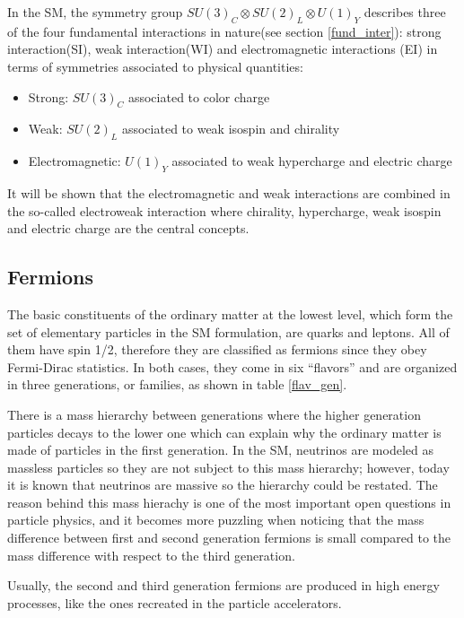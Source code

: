 \noindent In the SM, the symmetry group $SU(3)_C\otimes SU(2)_L\otimes U(1)_Y$ describes three of the four fundamental interactions in nature(see section \ref{fund_inter}): strong interaction(SI), weak interaction(WI) and electromagnetic interactions (EI) in terms of symmetries associated to physical quantities:
\begin{itemize}
\item Strong: $SU(3)_C$ associated to color charge
\item Weak: $SU(2)_L$ associated to weak isospin and chirality
\item Electromagnetic: $U(1)_Y$ associated to weak hypercharge and electric charge
\end{itemize}

\noindent It will be shown that the electromagnetic and weak interactions are combined in the so-called electroweak interaction where chirality, hypercharge, weak isospin and electric charge are the central concepts. 

\subsection{Fermions}\label{fermions}

\noindent The basic constituents of the ordinary matter at the lowest level, which form the set of elementary particles in the SM formulation, are quarks and leptons. All of them have spin 1/2, therefore they are classified as fermions since they obey Fermi-Dirac statistics. In both cases, they come in six ``flavors'' and are organized in three generations, or families, as shown in table \ref{flav_gen}.

\noindent There is a mass hierarchy between generations where the higher generation particles decays to the lower one which can explain why the ordinary matter is made of particles in the first generation. In the SM, neutrinos are modeled as massless particles so they are not subject to this mass hierarchy; however, today it is known that neutrinos are massive so the hierarchy could be restated. The reason behind this mass hierachy is one of the most important open questions in particle physics, and it becomes more puzzling when noticing that the mass difference between first and second generation fermions is small compared to the mass difference with respect to the third generation.

\noindent Usually, the second and third generation fermions are produced in high energy processes, like the ones recreated in the particle accelerators.         
 
